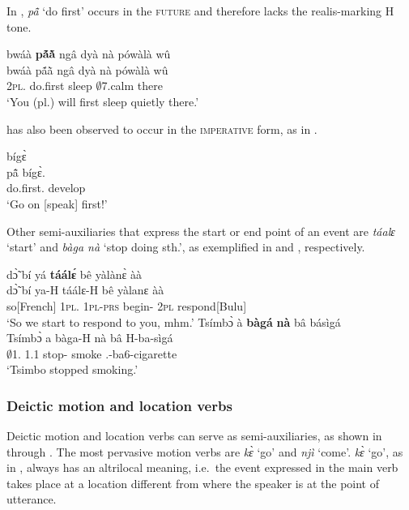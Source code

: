 \noindent In , {\itshape pã̂} `do first' occurs in the \textsc{future} and therefore lacks the realis-marking H tone.

\ea\label{pa2}
  \glll bwáà {\bfseries pã́ã̀} ngâ dyà nà pówàlà wû\\
        bwáà pã́ã̀ ngâ dyà nà pówàlà wû \\
        2\textsc{pl}.{\FUT} do.first {\PL} sleep {\COM} $\emptyset$7.calm there\\
    \trans `You (pl.) will first sleep quietly there.'
\z

 has also been observed to occur in the \textsc{imperative} form, as in .

\ea\label{pa3}
   bígɛ̀  \\
        pã̂ bígɛ̀.  \\
         do.first.{\IMP}  develop\\
    \trans `Go on [speak] first!'
\z




Other semi-auxiliaries that express the start or end point of an event are {\itshape táalɛ} `start' and {\itshape bàga nà} `stop doing sth.', as exemplified in  and , respectively.

\ea\label{start1}
  \glll  dɔ̃̀ bí yá {\bfseries táálɛ́} bê yàlànɛ̀ àà \\
        dɔ̃̀ bí ya-H táálɛ-H bê yàlanɛ àà \\
       so[French] 1\textsc{pl}.{\SBJ}  1\textsc{pl}-\textsc{prs} begin-{\R} 2\textsc{pl} respond[Bulu] {\EXCL}   \\
    \trans `So we start to respond to you, mhm.'
\ex\label{stop1}
  \glll  Tsímbɔ̀ à {\bfseries bàgá} {\bfseries nà} bâ básìgá \\
        Tsímbɔ̀ a bàga-H nà bâ H-ba-sìgá  \\
       $\emptyset$1.{\PN} 1.{\PST}1 stop-{\R} {\COM} smoke {\OBJ}.{\LINK}-ba6-cigarette\\
    \trans `Tsimbo stopped smoking.'
\z



\subsubsection*{Deictic motion and location verbs}
Deictic motion and location verbs can serve as semi-auxiliaries, as shown in  through . The most pervasive motion verbs are {\itshape kɛ̀} `go' and {\itshape njì} `come'. {\itshape kɛ̀} `go', as in , always has an altrilocal meaning, i.e.\ the event expressed in the main verb takes place at a location different from where the speaker is at the point of utterance.


